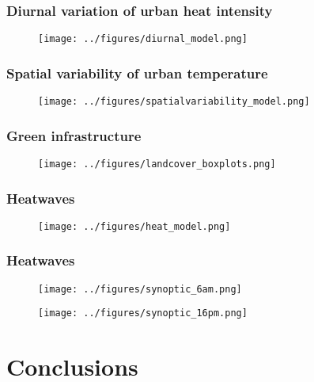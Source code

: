 \documentclass[aspectratio=169, 10pt]{beamer}
\begin{document}
\begin{frame}
\frametitle{Diurnal variation of urban heat intensity}
\begin{figure}
\texttt{[image: ../figures/diurnal\_model.png]}
\end{figure}
\end{frame}

\begin{frame}
\frametitle{Spatial variability of urban temperature}
\begin{figure}
\texttt{[image: ../figures/spatialvariability\_model.png]}
\end{figure}
\end{frame}

\begin{frame}
\frametitle{Green infrastructure}
\begin{figure}
\texttt{[image: ../figures/landcover\_boxplots.png]}
\end{figure}
\end{frame}

\begin{frame}
\frametitle{Heatwaves}
\begin{figure}
\texttt{[image: ../figures/heat\_model.png]}
\end{figure}
\end{frame}


\begin{frame}
\frametitle{Heatwaves}
\begin{figure}
\texttt{[image: ../figures/synoptic\_6am.png]}

\texttt{[image: ../figures/synoptic\_16pm.png]}
\end{figure}
\end{frame}

\section{Conclusions} 
\end{document}

